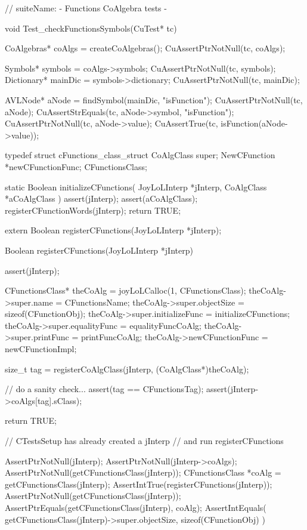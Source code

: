\starttyping
// suiteName: - Functions CoAlgebra tests -

void Test_checkFunctionsSymbols(CuTest* tc) {
  CoAlgebras* coAlgs = createCoAlgebras();
  CuAssertPtrNotNull(tc, coAlgs);

  Symbols* symbols = coAlgs->symbols;
  CuAssertPtrNotNull(tc, symbols);
  Dictionary* mainDic = symbols->dictionary;
  CuAssertPtrNotNull(tc, mainDic);

  AVLNode* aNode = findSymbol(mainDic, "isFunction");
  CuAssertPtrNotNull(tc, aNode);
  CuAssertStrEquals(tc, aNode->symbol, "isFunction");
  CuAssertPtrNotNull(tc, aNode->value);
  CuAssertTrue(tc, isFunction(aNode->value));
}
\stoptyping

\startTestSuite[registerCFunctions]

\startCHeader
typedef struct cFunctions_class_struct {
  CoAlgClass    super;
  NewCFunction *newCFunctionFunc;
} CFunctionsClass;
\stopCHeader

\startCCode
static Boolean initializeCFunctions(
  JoyLoLInterp *jInterp,
  CoAlgClass   *aCoAlgClass
) {
  assert(jInterp);
  assert(aCoAlgClass);
  registerCFunctionWords(jInterp);
  return TRUE;
}
\stopCCode

\startCHeader
extern Boolean registerCFunctions(JoyLoLInterp *jInterp);
\stopCHeader
{}

\startCCode
Boolean registerCFunctions(JoyLoLInterp *jInterp) {
  assert(jInterp);
  
  CFunctionsClass* theCoAlg    =
    joyLoLCalloc(1, CFunctionsClass);
  theCoAlg->super.name           = CFunctionsName;
  theCoAlg->super.objectSize     = sizeof(CFunctionObj);
  theCoAlg->super.initializeFunc = initializeCFunctions;
  theCoAlg->super.equalityFunc   = equalityFuncCoAlg;
  theCoAlg->super.printFunc      = printFuncCoAlg;
  theCoAlg->newCFunctionFunc     = newCFunctionImpl;
  
  size_t tag =
    registerCoAlgClass(jInterp, (CoAlgClass*)theCoAlg);

  // do a sanity check...
  assert(tag == CFunctionsTag);
  assert(jInterp->coAlgs[tag].sClass);

  return TRUE;
}
\stopCCode


\startCTest
  // CTestsSetup has already created a jInterp
  // and run registerCFunctions
  
  AssertPtrNotNull(jInterp);
  AssertPtrNotNull(jInterp->coAlgs);
  AssertPtrNotNull(getCFunctionsClass(jInterp));
  CFunctionsClass *coAlg =
    getCFunctionsClass(jInterp);
  AssertIntTrue(registerCFunctions(jInterp));
  AssertPtrNotNull(getCFunctionsClass(jInterp));
  AssertPtrEquals(getCFunctionsClass(jInterp), coAlg);
  AssertIntEquals(
    getCFunctionsClass(jInterp)->super.objectSize,
    sizeof(CFunctionObj)
  )
\stopCTest
\stopTestCase
\stopTestSuite